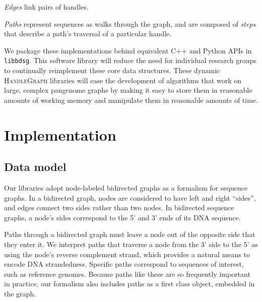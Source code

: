 \documentclass{article}
\begin{document}
\emph{Edges} link pairs of handles. %

\emph{Paths} represent sequences as walks through the graph, and are composed of \emph{steps} that describe a path's traversal of a particular handle.

We package these implementations behind equivalent C++ and Python APIs in \texttt{libbdsg}.
This software library will reduce the need for individual research groups to continually reimplement these core data structures.
These dynamic \textsc{HandleGraph} libraries will ease the development of algorithms that work on large, complex pangenome graphs by making it easy to store them in reasonable amounts of working memory and manipulate them in reasonable amounts of time.




\section{Implementation}

\subsection{Data model}

Our libraries adopt node-labeled bidirected graphs as a formalism for sequence graphs. In a bidirected graph, nodes are considered to have left and right ``sides'', and edges connect two sides rather than two nodes. In bidirected sequence graphs, a node's sides correspond to the 5' and 3' ends of its DNA sequence. 

Paths through a bidirected graph must leave a node out of the opposite side that they enter it. We interpret paths that traverse a node from the 3' side to the 5' as using the node's reverse complement strand, which provides a natural means to encode DNA strandedness. Specific paths correspond to sequences of interest, such as reference genomes. Because paths like these are so frequently important in practice, our formalism also includes paths as a first class object, embedded in the graph.
\end{document}
